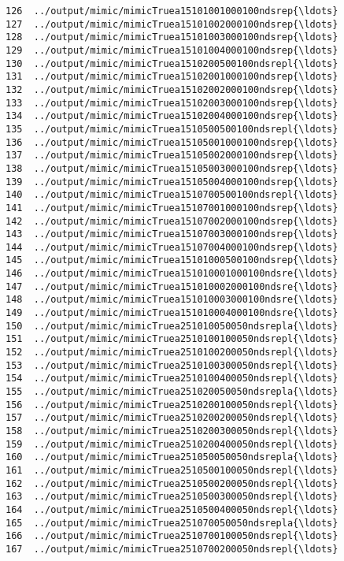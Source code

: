 \documentclass[11pt]{article}
\begin{document}
\begin{Verbatim}[commandchars=\\\{\}]
126  ../output/mimic/mimicTruea15101001000100ndsrep{\ldots}  
127  ../output/mimic/mimicTruea15101002000100ndsrep{\ldots}  
128  ../output/mimic/mimicTruea15101003000100ndsrep{\ldots}  
129  ../output/mimic/mimicTruea15101004000100ndsrep{\ldots}  
130  ../output/mimic/mimicTruea1510200500100ndsrepl{\ldots}  
131  ../output/mimic/mimicTruea15102001000100ndsrep{\ldots}  
132  ../output/mimic/mimicTruea15102002000100ndsrep{\ldots}  
133  ../output/mimic/mimicTruea15102003000100ndsrep{\ldots}  
134  ../output/mimic/mimicTruea15102004000100ndsrep{\ldots}  
135  ../output/mimic/mimicTruea1510500500100ndsrepl{\ldots}  
136  ../output/mimic/mimicTruea15105001000100ndsrep{\ldots}  
137  ../output/mimic/mimicTruea15105002000100ndsrep{\ldots}  
138  ../output/mimic/mimicTruea15105003000100ndsrep{\ldots}  
139  ../output/mimic/mimicTruea15105004000100ndsrep{\ldots}  
140  ../output/mimic/mimicTruea1510700500100ndsrepl{\ldots}  
141  ../output/mimic/mimicTruea15107001000100ndsrep{\ldots}  
142  ../output/mimic/mimicTruea15107002000100ndsrep{\ldots}  
143  ../output/mimic/mimicTruea15107003000100ndsrep{\ldots}  
144  ../output/mimic/mimicTruea15107004000100ndsrep{\ldots}  
145  ../output/mimic/mimicTruea15101000500100ndsrep{\ldots}  
146  ../output/mimic/mimicTruea151010001000100ndsre{\ldots}  
147  ../output/mimic/mimicTruea151010002000100ndsre{\ldots}  
148  ../output/mimic/mimicTruea151010003000100ndsre{\ldots}  
149  ../output/mimic/mimicTruea151010004000100ndsre{\ldots}  
150  ../output/mimic/mimicTruea251010050050ndsrepla{\ldots}  
151  ../output/mimic/mimicTruea2510100100050ndsrepl{\ldots}  
152  ../output/mimic/mimicTruea2510100200050ndsrepl{\ldots}  
153  ../output/mimic/mimicTruea2510100300050ndsrepl{\ldots}  
154  ../output/mimic/mimicTruea2510100400050ndsrepl{\ldots}  
155  ../output/mimic/mimicTruea251020050050ndsrepla{\ldots}  
156  ../output/mimic/mimicTruea2510200100050ndsrepl{\ldots}  
157  ../output/mimic/mimicTruea2510200200050ndsrepl{\ldots}  
158  ../output/mimic/mimicTruea2510200300050ndsrepl{\ldots}  
159  ../output/mimic/mimicTruea2510200400050ndsrepl{\ldots}  
160  ../output/mimic/mimicTruea251050050050ndsrepla{\ldots}  
161  ../output/mimic/mimicTruea2510500100050ndsrepl{\ldots}  
162  ../output/mimic/mimicTruea2510500200050ndsrepl{\ldots}  
163  ../output/mimic/mimicTruea2510500300050ndsrepl{\ldots}  
164  ../output/mimic/mimicTruea2510500400050ndsrepl{\ldots}  
165  ../output/mimic/mimicTruea251070050050ndsrepla{\ldots}  
166  ../output/mimic/mimicTruea2510700100050ndsrepl{\ldots}  
167  ../output/mimic/mimicTruea2510700200050ndsrepl{\ldots}  

\end{Verbatim}
\end{document}
